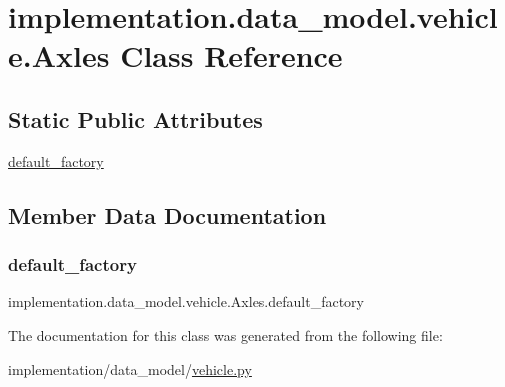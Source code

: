\hypertarget{classimplementation_1_1data__model_1_1vehicle_1_1_axles}{}\section{implementation.\+data\+\_\+model.\+vehicle.\+Axles Class Reference}
\label{classimplementation_1_1data__model_1_1vehicle_1_1_axles}
\subsection*{Static Public Attributes}
\begin{DoxyCompactItemize}
\item 
\hyperlink{classimplementation_1_1data__model_1_1vehicle_1_1_axles_a911dfe1bd8da78eed5aeef0f80854861}{default\+\_\+factory}
\end{DoxyCompactItemize}


\subsection{Member Data Documentation}
\mbox{\label{classimplementation_1_1data__model_1_1vehicle_1_1_axles_a911dfe1bd8da78eed5aeef0f80854861}} 
\subsubsection{\texorpdfstring{default\+\_\+factory}{default\_factory}}
{\footnotesize\ttfamily implementation.\+data\+\_\+model.\+vehicle.\+Axles.\+default\+\_\+factory\hspace{0.3cm}{\ttfamily [static]}}



The documentation for this class was generated from the following file\+:\begin{DoxyCompactItemize}
\item 
implementation/data\+\_\+model/\hyperlink{vehicle_8py}{vehicle.\+py}\end{DoxyCompactItemize}
